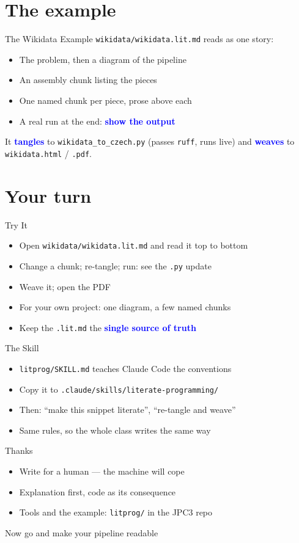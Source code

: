 \documentclass[xetex,aspectratio=169]{beamer}
\newcommand{\txx}[1]{\textbf{\textcolor{blue}{#1}}}
\begin{document}
\section{The example}

\begin{frame}[fragile]{The Wikidata Example}
  \texttt{wikidata/wikidata.lit.md} reads as one story:
  \begin{itemize}
  \item The problem, then a diagram of the pipeline
  \item An assembly chunk listing the pieces
  \item One named chunk per piece, prose above each
  \item A real run at the end: \txx{show the output}
  \end{itemize}
  \bigskip
  It \txx{tangles} to \texttt{wikidata\_to\_czech.py} (passes \texttt{ruff}, runs
  live) and \txx{weaves} to \texttt{wikidata.html} / \texttt{.pdf}.
\end{frame}

\section{Your turn}

\begin{frame}{Try It}
  \begin{itemize}
  \item Open \texttt{wikidata/wikidata.lit.md} and read it top to bottom
  \item Change a chunk; re-tangle; run: see the \texttt{.py} update
  \item Weave it; open the PDF
  \item For your own project: one diagram, a few named chunks
  \item Keep the \texttt{.lit.md} the \txx{single source of truth}
  \end{itemize}
\end{frame}

\begin{frame}{The Skill}
  \begin{itemize}
  \item \texttt{litprog/SKILL.md} teaches Claude Code the conventions
  \item Copy it to \texttt{.claude/skills/literate-programming/}
  \item Then: ``make this snippet literate'', ``re-tangle and weave''
  \item Same rules, so the whole class writes the same way
  \end{itemize}
\end{frame}

\begin{frame}{Thanks}
  \begin{itemize}
  \item Write for a human --- the machine will cope
  \item Explanation first, code as its consequence
  \item Tools and the example: \texttt{litprog/} in the JPC3 repo
  \end{itemize}
  \bigskip
  \centering Now go and make your pipeline readable
\end{frame}
\end{document}

